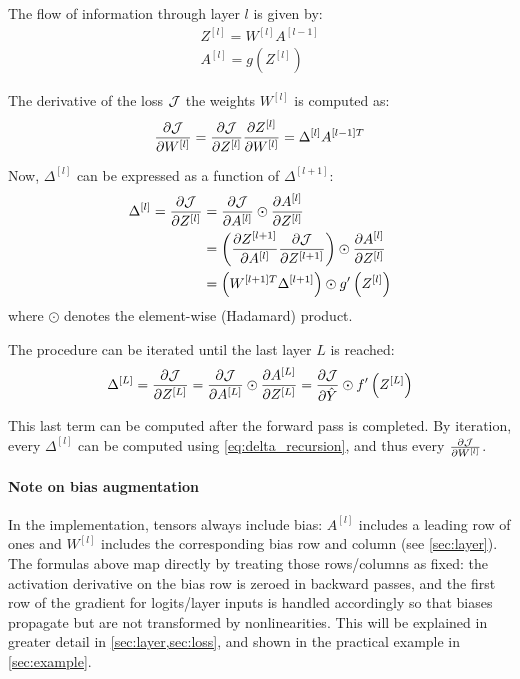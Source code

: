 The flow of information through layer $l$ is given by:
\begin{gather}
    Z^{[l]} = W^{[l]} A^{[l-1]} \label{eq:lin_forward}\\
    A^{[l]} = g\left(Z^{[l]}\right) \label{eq:act_forward}
\end{gather}

The derivative of the loss $\mathcal{J}$ \wrt the weights $W^{[l]}$ is computed as:
\begin{equation} \label{eq:weight_grad}
    \pdv{\mathcal{J}}{W^{[l]}} = \pdv{\mathcal{J}}{Z^{[l]}} \pdv{Z^{[l]}}{W^{[l]}} = \Delta^{[l]} A^{[l-1]T}
\end{equation}

Now, $\Delta^{[l]}$ can be expressed as a function of $\Delta^{[l + 1]}$:
\begin{equation} \label{eq:delta_recursion}
\begin{split}
    \Delta^{[l]} = \pdv{\mathcal{J}}{Z^{[l]}} &= \pdv{\mathcal{J}}{A^{[l]}} \odot \pdv{A^{[l]}}{Z^{[l]}}\\
    &= \left(\pdv{Z^{[l+1]}}{A^{[l]}} \pdv{\mathcal{J}}{Z^{[l+1]}} \right) \odot \pdv{A^{[l]}}{Z^{[l]}}\\
    &= \left(W^{[l+1]T} \Delta^{[l+1]} \right) \odot g'\left(Z^{[l]}\right)
\end{split}
\end{equation}
where $\odot$ denotes the element-wise (Hadamard) product.

The procedure can be iterated until the last layer $L$ is reached:
\begin{equation*}
    \Delta^{[L]} = \pdv{\mathcal{J}}{Z^{[L]}} = \pdv{\mathcal{J}}{A^{[L]}} \odot \pdv{A^{[L]}}{Z^{[L]}} = \pdv{\mathcal{J}}{\hat{Y}} \odot f'\left(Z^{[L]}\right)
\end{equation*}

This last term can be computed after the forward pass is completed. By iteration, every $\Delta^{[l]}$ can be computed using \cref{eq:delta_recursion}, and thus every $\pdv{\mathcal{J}}{W^{[l]}}$.

\paragraph{Note on bias augmentation} In the implementation, tensors always include bias: $A^{[l]}$ includes a leading row of ones and $W^{[l]}$ includes the corresponding bias row and column (see \cref{sec:layer}). The formulas above map directly by treating those rows/columns as fixed: the activation derivative on the bias row is zeroed in backward passes, and the first row of the gradient for logits/layer inputs is handled accordingly so that biases propagate but are not transformed by nonlinearities. This will be explained in greater detail in \cref{sec:layer,sec:loss}, and shown in the practical example in \cref{sec:example}.
